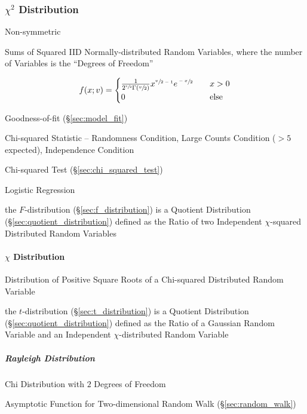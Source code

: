 \subsubsection{$\chi^2$ Distribution}\label{sec:chi_squared}

Non-symmetric

Sums of Squared IID Normally-distributed Random Variables, where the number of
Variables is the ``Degrees of Freedom''

\[
  f(x; v) =
  \begin{cases}
    \frac{1}{2^{\sfrac{v}{2}}\Gamma(\sfrac{v}{2})}
      x^{\sfrac{v}{2-1}} e^{\sfrac{-x}{2}}
          & \quad x > 0 \\
    0     & \quad\text{else} \\
  \end{cases}
\]

Goodness-of-fit (\S\ref{sec:model_fit})

Chi-squared Statistic -- Randomness Condition, Large Counts Condition ($>5$
expected), Independence Condition

\fist Chi-squared Test (\S\ref{sec:chi_squared_test})

Logistic Regression

the $F$-distribution (\S\ref{sec:f_distribution}) is a Quotient Distribution
(\S\ref{sec:quotient_distribution}) defined as the Ratio of two Independent
$\chi$-squared Distributed Random Variables



\paragraph{$\chi$ Distribution}\label{sec:chi_distribution}\hfill

Distribution of Positive Square Roots of a Chi-squared Distributed Random
Variable

the $t$-distribution (\S\ref{sec:t_distribution}) is a Quotient Distribution
(\S\ref{sec:quotient_distribution}) defined as the Ratio of a Gaussian Random
Variable and an Independent $\chi$-distributed Random Variable



\subparagraph{Rayleigh Distribution}\label{sec:rayleigh_distribution}\hfill

Chi Distribution with $2$ Degrees of Freedom

Asymptotic Function for Two-dimensional Random Walk (\S\ref{sec:random_walk})



